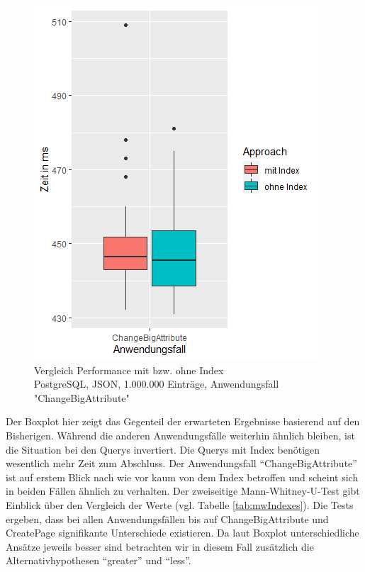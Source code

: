 \begin{figure}[H]
\centering
\includegraphics[scale=0.5]{rStudioPictures/json1mIndexesCBA.png}
\caption{Vergleich Performance mit bzw. ohne Index \\ PostgreSQL, JSON, 1.000.000 Einträge, Anwendungsfall "ChangeBigAttribute"}
\label{fig:json1mIndexCBA}
\end{figure}

Der Boxplot hier zeigt das Gegenteil der erwarteten Ergebnisse basierend auf den Bisherigen. Während die anderen Anwendungsfälle weiterhin ähnlich bleiben, ist die Situation bei den Querys invertiert. Die Querys mit Index benötigen wesentlich mehr Zeit zum Abschluss.
Der Anwendungsfall ``ChangeBigAttribute'' ist auf erstem Blick nach wie vor kaum von dem Index betroffen und scheint sich in beiden Fällen ähnlich zu verhalten.
Der zweiseitige Mann-Whitney-U-Test gibt Einblick über den Vergleich der Werte (vgl. Tabelle \ref{tab:mwIndexes}). Die Tests ergeben, dass bei allen Anwendungsfällen bis auf ChangeBigAttribute und CreatePage signifikante Unterschiede existieren. Da laut Boxplot unterschiedliche Ansätze jeweils besser sind betrachten wir in diesem Fall zusätzlich die Alternativhypothesen ``greater'' und ``less''.

